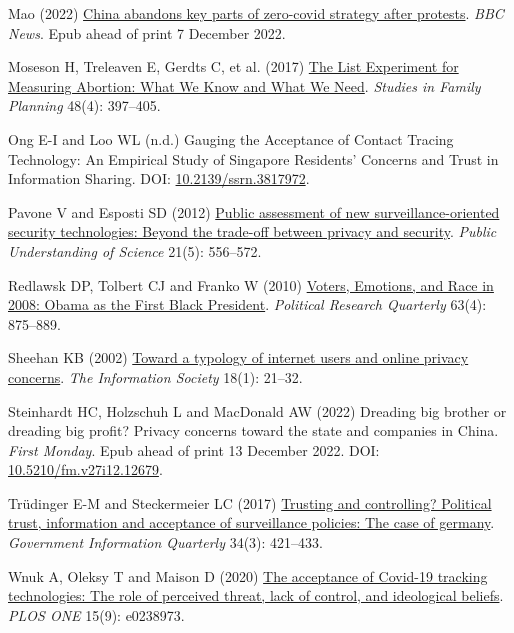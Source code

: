 \documentclass[
  letterpaper,
  DIV=11,
  numbers=noendperiod]{scrartcl}
\newlength{\cslhangindent}
\newenvironment{CSLReferences}[2] %
 {\begin{list}{}{%
  \setlength{\itemindent}{0pt}
  \setlength{\leftmargin}{0pt}
  \setlength{\parsep}{0pt}
  \ifodd #1
   \setlength{\leftmargin}{\cslhangindent}
   \setlength{\itemindent}{-1\cslhangindent}
  \fi
  \setlength{\itemsep}{#2\baselineskip}}}
 {\end{list}}
\begin{document}
\begin{CSLReferences}{1}{1}
Mao (2022)
\href{https://www.bbc.com/news/world-asia-china-63855508}{China abandons
key parts of zero-covid strategy after protests}. \emph{BBC News}. Epub
ahead of print 7 December 2022.

Moseson H, Treleaven E, Gerdts C, et al. (2017)
\href{https://doi.org/10.1111/sifp.12042}{The List Experiment for
Measuring Abortion: What We Know and What We Need}. \emph{Studies in
Family Planning} 48(4): 397--405.

Ong E-I and Loo WL (n.d.) Gauging the Acceptance of Contact Tracing
Technology: An Empirical Study of Singapore Residents' Concerns and
Trust in Information Sharing. DOI:
\href{https://doi.org/10.2139/ssrn.3817972}{10.2139/ssrn.3817972}.

Pavone V and Esposti SD (2012)
\href{https://doi.org/10.1177/0963662510376886}{Public assessment of new
surveillance-oriented security technologies: Beyond the trade-off
between privacy and security}. \emph{Public Understanding of Science}
21(5): 556--572.

Redlawsk DP, Tolbert CJ and Franko W (2010)
\href{https://doi.org/10.1177/1065912910373554}{Voters, Emotions, and
Race in 2008: Obama as the First Black President}. \emph{Political
Research Quarterly} 63(4): 875--889.

Sheehan KB (2002)
\href{https://doi.org/10.1080/01972240252818207}{Toward a typology of
internet users and online privacy concerns}. \emph{The Information
Society} 18(1): 21--32.

Steinhardt HC, Holzschuh L and MacDonald AW (2022) Dreading big brother
or dreading big profit? Privacy concerns toward the state and companies
in China. \emph{First Monday}. Epub ahead of print 13 December 2022.
DOI:
\href{https://doi.org/10.5210/fm.v27i12.12679}{10.5210/fm.v27i12.12679}.

Trüdinger E-M and Steckermeier LC (2017)
\href{https://doi.org/10.1016/j.giq.2017.07.003}{Trusting and
controlling? Political trust, information and acceptance of surveillance
policies: The case of germany}. \emph{Government Information Quarterly}
34(3): 421--433.

Wnuk A, Oleksy T and Maison D (2020)
\href{https://doi.org/10.1371/journal.pone.0238973}{The acceptance of
Covid-19 tracking technologies: The role of perceived threat, lack of
control, and ideological beliefs}. \emph{PLOS ONE} 15(9): e0238973.


\end{CSLReferences}
\end{document}
